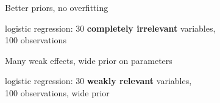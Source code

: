 \documentclass[english,t]{beamer}
\begin{document}
\begin{frame}{Better priors, no overfitting}

  logistic regression: 30 \textbf{completely irrelevant} variables, \\100
  observations
  
  
\end{frame}

\begin{frame}{Many weak effects, wide prior on parameters}

  logistic regression: 30 \textbf{weakly relevant} variables, \\100
  observations, wide prior
  

\end{frame}
\end{document}
